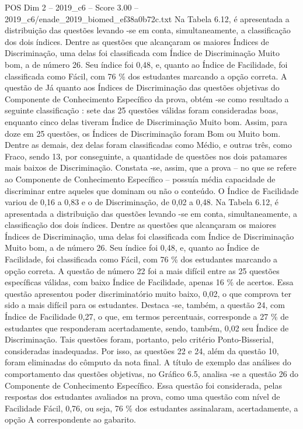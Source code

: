 \begin{textsample}{POS Dim 2 – 2019\_c6 – Score 3.00 – 2019\_c6/enade\_2019\_biomed\_ef38a0b72c.txt}
Na Tabela 6.12, é apresentada a distribuição das questões levando -se em conta, simultaneamente, a classificação dos dois índices.
Dentre as questões que alcançaram os maiores Índices de Discriminação, uma delas foi classificada com Índice de Discriminação Muito bom, a de número 26.
Seu índice foi 0,48, e, quanto ao Índice de Facilidade, foi classificada como Fácil, com 76 \% dos estudantes marcando a opção correta.
A questão de Já quanto aos Índices de Discriminação das questões objetivas do Componente de Conhecimento Específico da prova, obtém -se como resultado a seguinte classificação : sete das 25 questões válidas foram consideradas boas, enquanto cinco delas tiveram Índice de Discriminação Muito bom.
Assim, para doze em 25 questões, os Índices de Discriminação foram Bom ou Muito bom.
Dentre as demais, dez delas foram classificadas como Médio, e outras três, como Fraco, sendo 13, por conseguinte, a quantidade de questões nos dois patamares mais baixos de Discriminação.
Constata -se, assim, que a prova – no que se refere ao Componente de Conhecimento Específico – possuía média capacidade de discriminar entre aqueles que dominam ou não o conteúdo.
O Índice de Facilidade variou de 0,16 a 0,83 e o de Discriminação, de 0,02 a 0,48.
Na Tabela 6.12, é apresentada a distribuição das questões levando -se em conta, simultaneamente, a classificação dos dois índices.
Dentre as questões que alcançaram os maiores Índices de Discriminação, uma delas foi classificada com Índice de Discriminação Muito bom, a de número 26.
Seu índice foi 0,48, e, quanto ao Índice de Facilidade, foi classificada como Fácil, com 76 \% dos estudantes marcando a opção correta.
A questão de número 22 foi a mais difícil entre as 25 questões específicas válidas, com baixo Índice de Facilidade, apenas 16 \% de acertos.
Essa questão apresentou poder discriminatório muito baixo, 0,02, o que comprova ter sido a mais difícil para os estudantes.
Destaca -se, também, a questão 24, com Índice de Facilidade 0,27, o que, em termos percentuais, corresponde a 27 \% de estudantes que responderam acertadamente, sendo, também, 0,02 seu Índice de Discriminação.
Tais questões foram, portanto, pelo critério Ponto-Bisserial, consideradas inadequadas.
Por isso, as questões 22 e 24, além da questão 10, foram eliminadas do cômputo da nota final.
A título de exemplo das análises do comportamento das questões objetivas, no Gráfico 6.5, analisa -se a questão 26 do Componente de Conhecimento Específico.
Essa questão foi considerada, pelas respostas dos estudantes avaliados na prova, como uma questão com nível de Facilidade Fácil, 0,76, ou seja, 76 \% dos estudantes assinalaram, acertadamente, a opção A correspondente ao gabarito.

\end{textsample}
